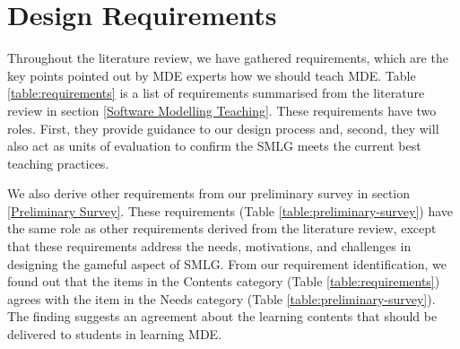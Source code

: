 \documentclass[12pt, a4paper]{report}
\begin{document}
\section{Design Requirements}
\label{Design Requirements}
Throughout the literature review, we have gathered requirements, which are the
key points pointed out by MDE experts how we should teach MDE. Table
\ref{table:requirements} is a list of requirements summarised from the
literature review in section \ref{Software Modelling Teaching}. These
requirements have two roles. First, they provide guidance to our design process
and, second, they will also act as units of evaluation to confirm the SMLG meets
the current best teaching practices.
 
We also derive other requirements from our preliminary survey in section \ref{Preliminary Survey}. 
These requirements (Table \ref{table:preliminary-survey}) have the same role as other requirements 
derived from the literature review, except that these requirements address the needs, motivations, 
and challenges in designing the gameful aspect of SMLG. From our requirement identification, we found out that the items in the Contents category (Table \ref{table:requirements}) agrees with the item in the Needs category (Table \ref{table:preliminary-survey}). The finding suggests an agreement about the learning contents that should be delivered to students in learning MDE.
\end{document}

